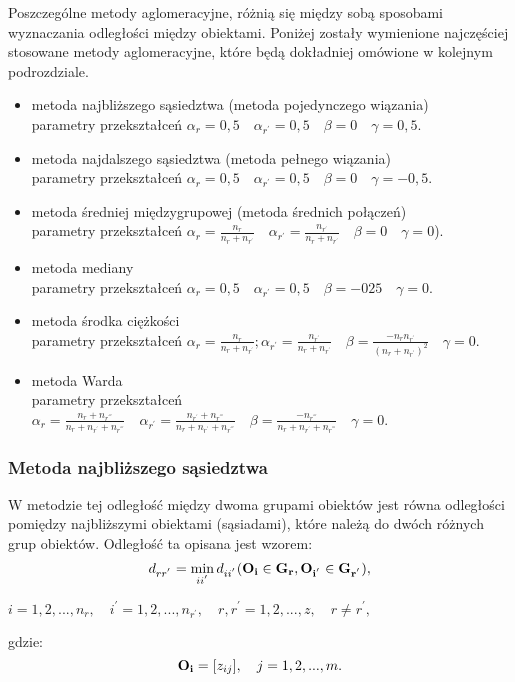 \documentclass[12pt,a4paper]{report}
\begin{document}
Poszczególne metody aglomeracyjne, różnią się między sobą sposobami wyznaczania odległości między obiektami. Poniżej zostały wymienione najczęściej stosowane metody aglomeracyjne, które będą dokładniej omówione w kolejnym podrozdziale.
\begin{itemize}
\item metoda najbliższego sąsiedztwa (metoda pojedynczego wiązania) \\
parametry  przekształceń $\alpha_{r}=0,5 \quad \alpha_{r^{'}}=0,5 \quad  \beta=0 \quad \gamma=0,5$.
\item metoda najdalszego sąsiedztwa (metoda pełnego wiązania)\\
parametry  przekształceń $\alpha_{r}=0,5 \quad \alpha_{r^{'}}=0,5 \quad \beta=0 \quad \gamma=-0,5$.
\item metoda średniej międzygrupowej (metoda średnich połączeń)\\
parametry  przekształceń $\alpha_{r}=\frac{n_{r}}{n_{r} + n_{r^{'}}} \quad \alpha_{r^{'}}=\frac{n_{r^{'}}}{n_{r} + n_{r^{'}}} \quad \beta=0 \quad \gamma=0$).
\item metoda mediany\\
parametry  przekształceń $\alpha_{r}=0,5 \quad \alpha_{r^{'}}=0,5 \quad \beta=-025 \quad \gamma=0$.
\item metoda środka ciężkości\\
parametry  przekształceń $\alpha_{r}=\frac{n_{r}}{n_{r} + n_{r^{'}}}; \alpha_{r^{'}}=\frac{n_{r^{'}}}{n_{r} + n_{r^{'}}} \quad \beta=\frac{-n_{r}n_{r^{'}}}{(n_{r} + n_{r^{'}})^{2}} \quad \gamma=0$.
\item metoda Warda\\
parametry  przekształceń $\alpha_{r}=\frac{n_{r}+n_{r^{'''}}}{n_{r} + n_{r^{'}}+n_{r^{'''}}} \quad \alpha_{r^{'}}=\frac{n_{r^{'}}+n_{r^{'''}}}{n_{r} + n_{r^{'}}+n_{r^{'''}}} \quad \beta=\frac{-n_{r^{'''}}}{n_{r} + n_{r^{'}}+n_{r^{'''}}} \quad \gamma=0$.

\end{itemize}
 
\subsubsection{Metoda najbliższego sąsiedztwa}
\noindent

W metodzie tej odległość między dwoma grupami obiektów jest równa odległości pomiędzy najbliższymi obiektami (sąsiadami), które należą do dwóch różnych grup obiektów. Odległość ta opisana jest wzorem:
\begin{equation}
d_{rr^{'}}= \min\limits_{ii^{'}} {d_{ii^{'}}(\bf{O_i} \in G_{r}, O_{i^{'}} \in G_{r^{'}})},
\end{equation}
\begin{center}
$i=1,2,...,n_{r}, \quad i^{'}=1,2,...,n_{r^{'}}, \quad r,r^{'}=1,2,...,z, \quad r \neq r^{'}, $
\end{center}
gdzie:\\
\begin{equation}
\bold{O_{i}}=[z_{ij}], \quad j=1,2,...,m.
\end{equation}
\end{document}
